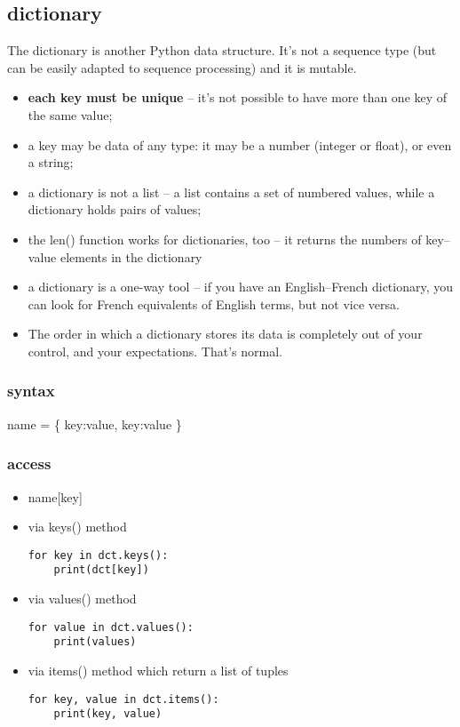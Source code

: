 \documentclass[11pt]{article}
\begin{document}
\subsection{dictionary}
\label{sec:orga41bfce}
The dictionary is another Python data structure. It’s not a sequence
type (but can be easily adapted to sequence processing) and it is
mutable.
\begin{itemize}
\item \textbf{each key must be unique} – it’s not possible to have more than one
key of the same value;
\item a key may be data of any type: it may be a number (integer or
float), or even a string;
\item a dictionary is not a list – a list contains a set of numbered
values, while a dictionary holds pairs of values;
\item the len() function works for dictionaries, too – it returns the
numbers of key–value elements in the dictionary
\item a dictionary is a one-way tool – if you have an English–French
dictionary, you can look for French equivalents of English terms,
but not vice versa.
\item The order in which a dictionary stores its data is completely out of
your control, and your expectations. That’s normal.
\end{itemize}

\subsubsection{syntax}
\label{sec:org3167f76}
name = \{ key:value, key:value \}

\subsubsection{access}
\label{sec:org0516ade}
\begin{itemize}
\item name[key]

\item via keys() method
\begin{verbatim}
for key in dct.keys():
    print(dct[key])
\end{verbatim}

\item via values() method
\begin{verbatim}
for value in dct.values():
    print(values)
\end{verbatim}

\item via items() method which return a list of tuples
\begin{verbatim}
for key, value in dct.items():
    print(key, value)
\end{verbatim}
\end{itemize}
\end{document}
